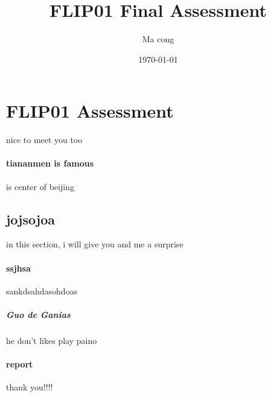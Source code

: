 \documentclass[UTF8]{cTexart}
\title{FLIP01 Final Assessment}
\author{Ma cong}
\date{\today}
\begin{document}
\maketitle
\section{FLIP01  Assessment}
nice to meet you too
\paragraph{tiananmen is famous}
is center of beijing
\subsection{jojsojoa}
in this section, i will give you and me a surprise
\paragraph{ssjhsa}
sankdsahdasohdoas
\subparagraph{Guo de Ganias}
he don't likes play paino
\paragraph{report}
thank you!!!!
\end{document}
